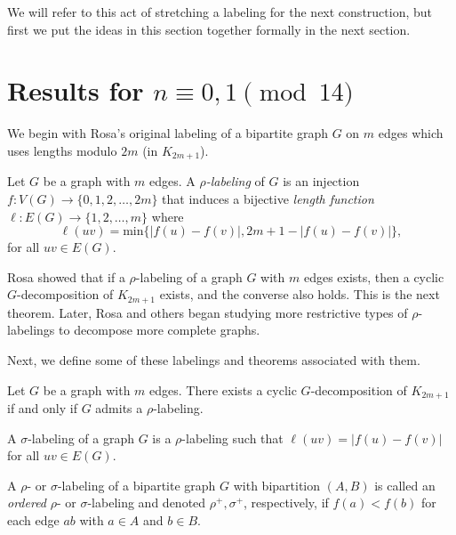   We will refer to this act of stretching a labeling for the next construction, but first we put the ideas in this section together formally in the next section.
\section{Results for $n\equiv 0,1 \pmod{14}$}\label{sec:0,1results}

We begin with Rosa's original labeling of a bipartite graph $G$ on $m$ edges which uses lengths modulo $2m$ (in $K_{2m+1}$). 

\begin{definition} \label{def:rho} 
 Let $G$ be a graph with $m$ edges.  A \textit{$\rho$-labeling} of $G$ is an injection $f: V(G) \rightarrow \{0,1,2, \dots, 2m\}$ that induces a bijective \textit{length function $\ell: E(G) \rightarrow \{1,2, \dots, m\}$} where 
    $$
    \ell(uv) = \text{min}\{|f(u)-f(v)|,2m+1-|f(u)-f(v)|\},
    $$
for all  $uv \in E(G)$.
\end{definition}

Rosa showed that if a $\rho$-labeling of a graph $G$ with $m$ edges exists, then a cyclic $G$-decomposition of $K_{2m+1}$ exists, and the converse also holds. This is the next theorem. Later, Rosa and others began studying more restrictive types of $\rho$-labelings to decompose more complete graphs. 

Next, we define some of these labelings and theorems associated with them.

\begin{thm}\label{thm:Rhosa}  
Let $G$ be a graph with $m$ edges.  There exists a cyclic $G$-decomposition of $K_{2m+1}$ if and only if $G$ admits a $\rho$-labeling.
\end{thm}

\begin{definition} \label{def:sigma} 
A $\sigma$-labeling of a graph $G$ is a $\rho$-labeling such that $\ell(uv) = |f(u) - f(v)|$ for all $uv \in E(G).$
\end{definition}

\begin{definition} \label{def:rho and sigma ordered def} 
A $\rho$- or $\sigma$-labeling of a bipartite graph $G$ with bipartition $(A,B)$ is called an \emph{ordered} $\rho$- or $\sigma$-labeling and denoted $\rho^+,\sigma^+$, respectively, if $f(a) < f(b)$ for each edge $ab$ with $a \in A$ and $b \in B$.
\end{definition}

